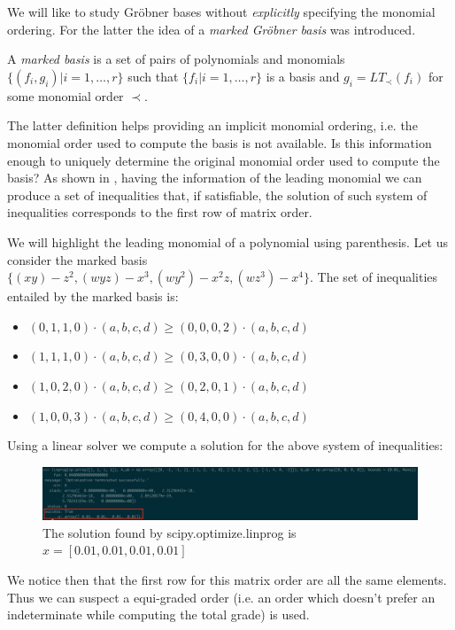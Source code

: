 We will like to study Gr\"obner bases without \emph{explicitly}
specifying the monomial ordering. For the latter the idea of a
\emph{marked Gr\"obner basis} was introduced.

\begin{definition} \cite{Cox:2014}
  A \emph{marked \grob basis} is a set of pairs of polynomials and monomials
  $\{(f_i, g_i) | i = 1, \dots, r\}$ such that $\{f_i | i = 1, \dots, r\}$ is
  a \grob basis and $g_i = LT_\prec(f_i)$ for some monomial order $\prec$.
\end{definition}

The latter definition helps providing an implicit monomial ordering,
i.e. the monomial order used to compute the \grob basis is not available.
Is this information enough to uniquely determine the original
monomial order used to compute the \grob basis? As shown in \cite{Cox:2014},
having the information of the leading monomial we can produce a set of
inequalities that, if satisfiable, the solution of such system of inequalities
corresponds to the first row of matrix order.

\begin{example} We will highlight the leading monomial of a polynomial using parenthesis.
  Let us consider the marked \grob basis $\{(xy)-z^2, (wyz)-x^3, (wy^2)-x^2z, (wz^3)-x^4\}$.
  The set of inequalities entailed by the marked \grob basis is:
  \begin{itemize}
  \item $(0, 1, 1, 0) \cdot (a, b, c, d) \geq (0, 0, 0, 2) \cdot (a, b, c, d)$
  \item $(1, 1, 1, 0) \cdot (a, b, c, d) \geq (0, 3, 0, 0) \cdot (a, b, c, d)$
  \item $(1, 0, 2, 0) \cdot (a, b, c, d) \geq (0, 2, 0, 1) \cdot (a, b, c, d)$
  \item $(1, 0, 0, 3) \cdot (a, b, c, d) \geq (0, 4, 0, 0) \cdot (a, b, c, d)$
  \end{itemize}
  Using a linear solver we compute a solution for the above system of inequalities:

  \begin{figure}[h]
    \centering
    \includegraphics[width=15cm]{example1}
    \caption{The solution found by scipy.optimize.linprog \cite{linprog} is $x = [0.01, 0.01, 0.01, 0.01]$}
  \end{figure}

  We notice then that the first row for this matrix order are all the same elements. Thus we can suspect
  a equi-graded order (i.e. an order which doesn't prefer an indeterminate while computing the total
  grade) is used. 
  
\end{example}

